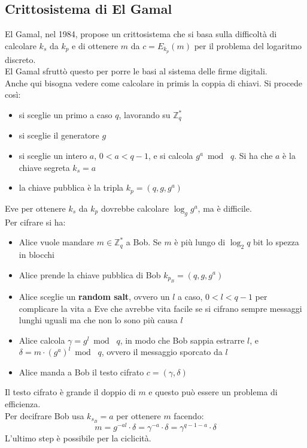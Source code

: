\documentclass[a4paper,12pt, oneside]{book}
\begin{document}
\subsection{Crittosistema di El Gamal}
El Gamal, nel 1984, propose un crittosistema che si basa sulla difficoltà di
calcolare $k_s$ da $k_p$ e di ottenere $m$ da $c=E_{k_p}(m)$ per il problema del
logaritmo discreto.\\
El Gamal sfruttò questo per porre le basi al sistema delle firme digitali. \\
Anche qui bisogna vedere come calcolare in primis la coppia di chiavi.
Si procede così:
\begin{itemize}
  \item si sceglie un primo a caso $q$, lavorando su $\mathbb{Z}_q^*$
  \item si sceglie il generatore $g$
  \item si sceglie un intero $a$, $0<a<q-1$, e si calcola $g^a\bmod\,\,q$. Si ha
  che $a$ è la chiave segreta $k_s=a$
  \item la chiave pubblica è la tripla $k_p=(q,g,g^a)$
\end{itemize}
Eve per ottenere $k_s$ da $k_p$ dovrebbe calcolare $\log_g g^a$, ma è
difficile.\\
Per cifrare si ha:
\begin{itemize}
  \item Alice vuole mandare $m\in\mathbb{Z}_q^*$ a Bob. Se $m$ è più lungo di
  $\log_2 q$ bit lo spezza in blocchi 
  \item Alice prende la chiave pubblica di Bob $k_{p_B}=(q,g,g^a)$
  \item Alice sceglie un \textbf{random salt}, ovvero un $l$ a caso, $0<l<q-1$
  per complicare la vita a Eve che avrebbe vita facile se si cifrano sempre
  messaggi lunghi uguali ma che non lo sono più causa $l$
  \item Alice calcola $\gamma=g^l\bmod \,\,q$, in modo che Bob sappia estrarre
  $l$, e $\delta=m\cdot (g^a)^l\bmod\,\,q$, ovvero il messaggio sporcato da $l$
  \item Alice manda a Bob il testo cifrato $c=(\gamma,\delta)$
\end{itemize}
Il testo cifrato è grande il doppio di $m$ e questo può essere un problema di
efficienza.\\
Per decifrare Bob usa $k_{s_B}=a$ per ottenere $m$ facendo: 
\[m=g^{-al}\cdot \delta=\gamma^{-a}\cdot \delta=\gamma^{q-1-a}\cdot \delta\]
L'ultimo step è possibile per la ciclicità.\\
\end{document}
